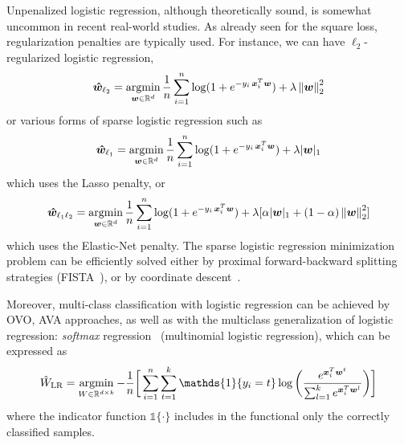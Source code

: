 			Unpenalized logistic regression, although theoretically sound, is somewhat uncommon in recent real-world studies. As already seen for the square loss, regularization penalties are typically used. For instance, we can have $\ell_2$-regularized logistic regression,
			\begin{equation} \label{eq:logistic_l2}
				\bm{\hat w}_{\ell_2} = \mathop{\mathrm{argmin}}\limits_{\bm{w} \in \mathbb{R}^d} \frac{1}{n}\sum_{i=1}^n\log(1 + e^{-y_i\,\bm{x}_i^T\bm{w}}) + \lambda \left\lVert\bm{w}\right\rVert_2^2
		  \end{equation}
			or various forms of sparse logistic regression such as
			\begin{equation} \label{eq:logistic_l1}
				\bm{\hat w}_{\ell_1} = \mathop{\mathrm{argmin}}\limits_{\bm{w} \in \mathbb{R}^d} \frac{1}{n}\sum_{i=1}^n\log(1 + e^{-y_i\,\bm{x}_i^T\bm{w}}) + \lambda |\bm{w}|_1
		  \end{equation}
			which uses the Lasso penalty, or
			\begin{equation} \label{eq:logistic_l1l2}
				\bm{\hat w}_{\ell_1\ell_2} = \mathop{\mathrm{argmin}}\limits_{\bm{w} \in \mathbb{R}^d} \frac{1}{n}\sum_{i=1}^n\log(1 + e^{-y_i\,\bm{x}_i^T\bm{w}}) + \lambda [\alpha |\bm{w}|_1 + (1-\alpha) \left\lVert\bm{w}\right\rVert_2^2]
		  \end{equation}
			which uses the Elastic-Net penalty.
      The sparse logistic regression minimization problem can be efficiently solved either by proximal forward-backward splitting strategies (\eg FISTA~\cite{beck2009fast}), or by coordinate descent~\cite{wu2008coordinate}.

			Moreover, multi-class classification with logistic regression can be achieved by OVO, AVA approaches, as well as with the multiclass generalization of logistic regression: \textit{softmax} regression~\cite{hastie2009elements} (\aka multinomial logistic regression), which can be expressed as
			\begin{equation} \label{eq:softmax}
				\hat W_{\text{LR}} = \argmin_{W \in \mathbb{R}^{d \times k}} -\frac{1}{n} \bigg[ \sum_{i=1}^n \sum_{t=1}^k \mathds{1}\{y_i = t\} \log \bigg(\frac{e^{\bm{x}_i^T\bm{w}^t}}{\sum_{l=1}^k e^{\bm{x}_i^T \bm{w}^l}} \bigg) \bigg]
			\end{equation}
			where the indicator function $\mathds{1}\{\cdot\}$ includes in the functional only the correctly classified samples.

